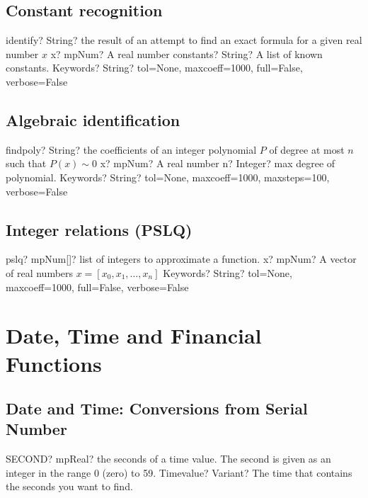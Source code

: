 \documentclass[12pt,a4paper,openany]{book}
\begin{document}
\section{Constant recognition}

\begin{mpFunctionsExtract}
\mpFunctionThree
{identify? String? the result of an attempt to find an exact formula for a given real number $x$}
{x? mpNum? A real number}
{constants? String? A list of known constants.}
{Keywords? String?  tol=None, maxcoeff=1000, full=False, verbose=False}
\end{mpFunctionsExtract}

\section{Algebraic identification}

\begin{mpFunctionsExtract}
\mpFunctionThree
{findpoly? String? the coefficients of an integer polynomial $P$ of degree at most $n$ such that $P(x) \sim 0$}
{x? mpNum? A real number}
{n? Integer? max degree of polynomial.}
{Keywords? String?  tol=None, maxcoeff=1000, maxsteps=100, verbose=False}
\end{mpFunctionsExtract}

\section{Integer relations (PSLQ)}

\begin{mpFunctionsExtract}
\mpFunctionTwo
{pslq? mpNum[]? list of integers to approximate a function.}
{x? mpNum? A vector of real numbers $x=[x_0,x_1,\ldots,x_n]$}
{Keywords? String?  tol=None, maxcoeff=1000, full=False, verbose=False}
\end{mpFunctionsExtract}

\chapter{Date, Time and Financial Functions}

\section{Date and Time: Conversions from Serial Number}

\begin{mpFunctionsExtract}
\mpWorksheetFunctionOneNotImplemented
{SECOND? mpReal? the seconds of a time value. The second is given as an integer in the range 0 (zero) to 59.}
{Timevalue? Variant? The time that contains the seconds you want to find.}
\end{mpFunctionsExtract}
\end{document}
